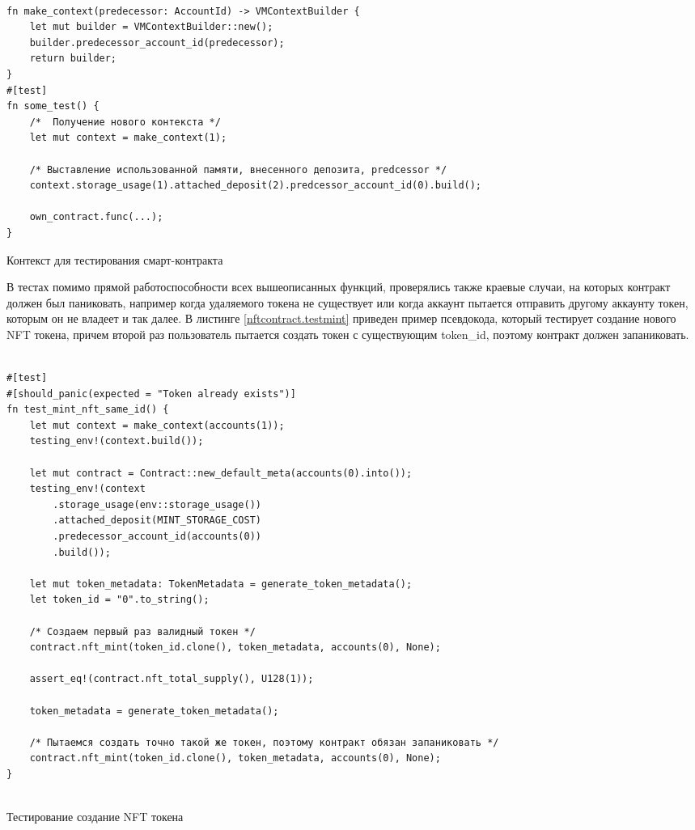 \begin{listing}
\begin{verbatim}

fn make_context(predecessor: AccountId) -> VMContextBuilder {
    let mut builder = VMContextBuilder::new();
    builder.predecessor_account_id(predecessor);
    return builder;
}
#[test]
fn some_test() {
    /*  Получение нового контекста */
    let mut context = make_context(1);

    /* Выставление использованной памяти, внесенного депозита, predcessor */
    context.storage_usage(1).attached_deposit(2).predcessor_account_id(0).build();

    own_contract.func(...);
}

\end{verbatim}
\caption{Контекст для тестирования смарт-контракта}
\label{contract.context}
\end{listing}

В тестах помимо прямой работоспособности всех вышеописанных функций, проверялись также краевые случаи, на которых контракт должен был паниковать, например когда удаляемого токена не существует или когда аккаунт пытается отправить другому аккаунту токен, которым он не владеет и так далее.
В листинге {\color{blue}\ref{nftcontract.testmint}} приведен пример псевдокода, который тестирует создание нового NFT токена, причем второй раз пользователь пытается создать токен с существующим token\_id, поэтому контракт должен запаниковать.

\begin{listing}
\begin{verbatim}

#[test]
#[should_panic(expected = "Token already exists")]
fn test_mint_nft_same_id() {
    let mut context = make_context(accounts(1));
    testing_env!(context.build());
        
    let mut contract = Contract::new_default_meta(accounts(0).into());
    testing_env!(context
        .storage_usage(env::storage_usage())
        .attached_deposit(MINT_STORAGE_COST)
        .predecessor_account_id(accounts(0))
        .build());
        
    let mut token_metadata: TokenMetadata = generate_token_metadata();
    let token_id = "0".to_string();
    
    /* Создаем первый раз валидный токен */
    contract.nft_mint(token_id.clone(), token_metadata, accounts(0), None);
        
    assert_eq!(contract.nft_total_supply(), U128(1));
        
    token_metadata = generate_token_metadata();
    
    /* Пытаемся создать точно такой же токен, поэтому контракт обязан запаниковать */
    contract.nft_mint(token_id.clone(), token_metadata, accounts(0), None);
}
    

\end{verbatim}
\caption{Тестирование создание NFT токена}
\label{nftcontract.testmint}
\end{listing}

